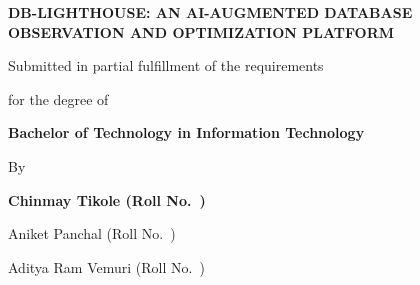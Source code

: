 \documentclass[12pt,a4paper]{report}
\begin{document}
\begin{titlepage}
\thispagestyle{empty}
\centering\singlespacing

\vspace*{0.3cm}

{\fontsize{22}{28}\selectfont\bfseries
DB-LIGHTHOUSE: AN AI-AUGMENTED DATABASE\\[4pt]
OBSERVATION AND OPTIMIZATION PLATFORM
\par}

\vspace{0.8cm}

{\fontsize{13}{17}\selectfont
Submitted in partial fulfillment of the requirements\par
for the degree of\par}

\vspace{0.5cm}

{\fontsize{16}{20}\selectfont\bfseries
Bachelor of Technology in Information Technology\par}

\vspace{0.8cm}

{\fontsize{13}{17}\selectfont By\par}

\vspace{0.4cm}

{\fontsize{13}{18}\selectfont\bfseries
Chinmay Tikole \quad (Roll No.\ \underline{\hspace{2.2cm}})\par
\vspace{4pt}
Aniket Panchal \quad (Roll No.\ \underline{\hspace{2.2cm}})\par
\vspace{4pt}
Aditya Ram Vemuri \quad (Roll No.\ \underline{\hspace{2.2cm}})\par}


\end{titlepage}
\end{document}
